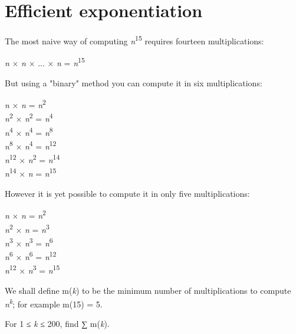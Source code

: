 \section[Problem \#122: Efficient exponentiation]{Efficient exponentiation}
\label{sec:problem_122}

The most naive way of computing \emph{n}\textsuperscript{15} requires
fourteen multiplications:

\begin{center}
\emph{n} × \emph{n} × ... × \emph{n} = \emph{n}\textsuperscript{15}
\end{center}

But using a "binary" method you can compute it in six multiplications:

\begin{center}
\emph{n} × \emph{n} = \emph{n}\textsuperscript{2}\\
\emph{n}\textsuperscript{2} × \emph{n}\textsuperscript{2} =
\emph{n}\textsuperscript{4}\\
\emph{n}\textsuperscript{4} × \emph{n}\textsuperscript{4} =
\emph{n}\textsuperscript{8}\\
\emph{n}\textsuperscript{8} × \emph{n}\textsuperscript{4} =
\emph{n}\textsuperscript{12}\\
\emph{n}\textsuperscript{12} × \emph{n}\textsuperscript{2} =
\emph{n}\textsuperscript{14}\\
\emph{n}\textsuperscript{14} × \emph{n} = \emph{n}\textsuperscript{15}
\end{center}

However it is yet possible to compute it in only five multiplications:

\begin{center}
\emph{n} × \emph{n} = \emph{n}\textsuperscript{2}\\
\emph{n}\textsuperscript{2} × \emph{n} = \emph{n}\textsuperscript{3}\\
\emph{n}\textsuperscript{3} × \emph{n}\textsuperscript{3} =
\emph{n}\textsuperscript{6}\\
\emph{n}\textsuperscript{6} × \emph{n}\textsuperscript{6} =
\emph{n}\textsuperscript{12}\\
\emph{n}\textsuperscript{12} × \emph{n}\textsuperscript{3} =
\emph{n}\textsuperscript{15}
\end{center}

We shall define m(\emph{k}) to be the minimum number of multiplications
to compute \emph{n}\textsuperscript{\emph{k}}; for example m(15) = 5.

For 1 ≤ \emph{k} ≤ 200, find {∑} m(\emph{k}).